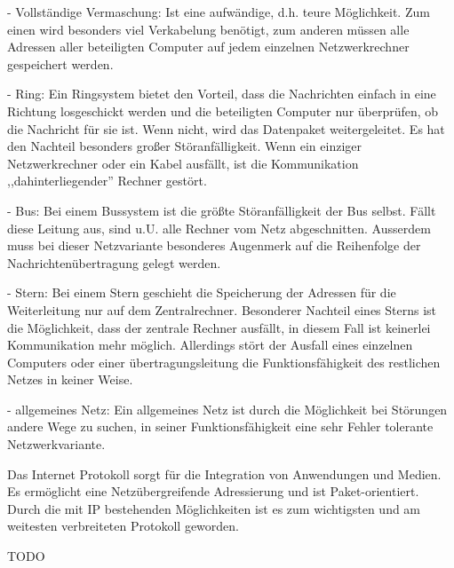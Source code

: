 \begin{answer}
- Vollständige Vermaschung:
Ist eine aufwändige, d.h. teure Möglichkeit. Zum einen wird besonders viel Verkabelung
benötigt, zum anderen müssen alle Adressen aller beteiligten Computer auf jedem einzelnen Netzwerkrechner
gespeichert werden.

- Ring:
Ein Ringsystem bietet den Vorteil, dass die Nachrichten einfach in eine Richtung losgeschickt
werden und die beteiligten Computer nur überprüfen, ob die Nachricht für sie ist. Wenn nicht,
wird das Datenpaket weitergeleitet.
Es hat den Nachteil besonders großer Störanfälligkeit. Wenn ein einziger Netzwerkrechner oder
ein Kabel ausfällt, ist die Kommunikation ,,dahinterliegender'' Rechner gestört.

- Bus:
Bei einem Bussystem ist die größte Störanfälligkeit der Bus selbst. Fällt diese Leitung aus, sind
u.U. alle Rechner vom Netz abgeschnitten. Ausserdem muss bei dieser Netzvariante besonderes
Augenmerk auf die Reihenfolge der Nachrichtenübertragung gelegt werden.

- Stern:
Bei einem Stern geschieht die Speicherung der Adressen für die Weiterleitung nur auf dem Zentralrechner.
Besonderer Nachteil eines Sterns ist die Möglichkeit, dass der zentrale Rechner ausfällt, in
diesem Fall ist keinerlei Kommunikation mehr möglich. Allerdings stört der Ausfall eines einzelnen
Computers oder einer übertragungsleitung die Funktionsfähigkeit des restlichen Netzes in keiner
Weise.

- allgemeines Netz:
Ein allgemeines Netz ist durch die Möglichkeit bei Störungen andere Wege zu suchen, in seiner
Funktionsfähigkeit eine sehr Fehler tolerante Netzwerkvariante.
\end{answer}

\begin{answer}
Das Internet Protokoll sorgt für die Integration von Anwendungen und Medien. Es ermöglicht
eine Netzübergreifende Adressierung und ist Paket-orientiert.
Durch die mit IP bestehenden Möglichkeiten ist es zum wichtigsten und am weitesten verbreiteten Protokoll geworden.
\end{answer}

\begin{answer}
TODO
\end{answer}